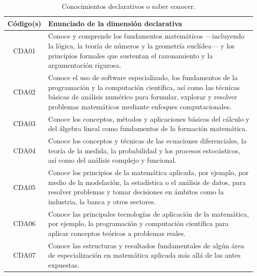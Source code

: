 \documentclass[11pt,a4paper]{article}
\begin{document}
\begin{table}[H]
\centering
\renewcommand{\arraystretch}{1.3}
\begin{tabular}{|c|p{9cm}|}
\hline
\cellcolor[HTML]{00C0F3}\textbf{Código(s)} & \cellcolor[HTML]{00C0F3}\textbf{Enunciado de la dimensión declarativa} \\
\hline
CDA01 & Conoce y comprende los fundamentos matemáticos —incluyendo la lógica, la teoría de números y la geometría euclídea— y los principios formales que sustentan el razonamiento y la argumentación rigurosa. \\
\hline
CDA02 & Conoce el uso de software especializado, los fundamentos de la programación y la computación científica, así como las técnicas básicas de análisis numérico para formular, explorar y resolver problemas matemáticos mediante enfoques computacionales. \\
\hline
CDA03 & Conoce los conceptos, métodos y aplicaciones básicos del cálculo y del álgebra lineal como fundamentos de la formación matemática. \\
\hline
CDA04 & Conoce los conceptos y técnicas de las ecuaciones diferenciales, la teoría de la medida, la probabilidad y los procesos estocásticos, así como del análisis complejo y funcional. \\
\hline
CDA05 & Conoce los principios de la matemática aplicada, por ejemplo, por medio de la modelación, la estadística o el análisis de datos, para resolver problemas y tomar decisiones en ámbitos como la industria, la banca y otros sectores.
\\
\hline
CDA06 & Conoce las principales tecnologías de aplicación de la matemática, por ejemplo, la programación y computación científica para aplicar conceptos teóricos a problemas reales.
\\
\hline
CDA07 & Conoce las estructuras y resultados fundamentales de algún área de especialización en matemática aplicada más allá de las antes expuestas. 
\\
\hline
\end{tabular}
\caption{Conocimientos declarativos o saber conocer.}
\end{table}

\end{document}
